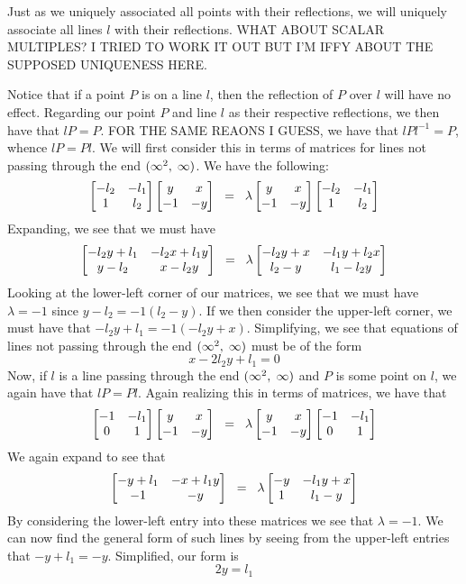\documentclass[12pt]{article}
\newcommand{\inv}{^{-1}}
\newcommand{\spceq}{\hspace{2mm} = \hspace{2mm}}
\newcommand{\ttc}{, \hspace{1mm}}
\newcommand{\lftmat}[4]{\begin{bmatrix} {#1} & {#2} \\ {#3} & {#4} \end{bmatrix}}
\newcommand{\pointmat}[2]{\lftmat{{#2}}{{#1}}{-1}{-{#2}}}
\newcommand{\stanpointmat}{\pointmat{x}{y}}
\newcommand{\linenoendmat}[2]{\begin{bmatrix} -{#2} & -{#1} \\ 1 & {#2} \end{bmatrix}}
\newcommand{\stanlinenoendmat}{\linenoendmat{l_1}{l_2}}
\newcommand{\lineendmat}[2]{\begin{bmatrix} -1 & -{#1} \\ 0 & 1 \end{bmatrix}}
\newcommand{\stanlineendmat}{\lineendmat{l_1}{l_2}}
\newcommand{\specialend}{(\infty^2\ttc\infty)}
\begin{document}
Just as we uniquely associated all points with their reflections, we will uniquely associate all lines $l$ with their reflections. WHAT ABOUT SCALAR MULTIPLES? I TRIED TO WORK IT OUT BUT I'M IFFY ABOUT THE SUPPOSED UNIQUENESS HERE. 

Notice that if a point $P$ is on a line $l$, then the reflection of $P$ over $l$ will have no effect. Regarding our point $P$ and line $l$ as their respective reflections, we then have that $lP = P$. FOR THE SAME REAONS I GUESS, we have that $lPl\inv = P$, whence $lP = Pl$. We will first consider this in terms of matrices for lines not passing through the end $\specialend$. We have the following:
\begin{equation} 
\stanlinenoendmat\stanpointmat \spceq \lambda \stanpointmat\stanlinenoendmat
\end{equation}	
Expanding, we see that we must have
\[
\lftmat{-l_2y+l_1}{-l_2x+l_1y}{y-l_2}{x-l_2y} \spceq \lambda \lftmat{-l_2y+x}{-l_1y+l_2x}{l_2-y}{l_1-l_2y}
\]
Looking at the lower-left corner of our matrices, we see that we must have $\lambda = -1$ since $y - l_2 = -1(l_2 - y)$. If we then consider the upper-left corner, we must have that $-l_2y + l_1 = -1(-l_2y + x)$. Simplifying, we see that equations of lines not passing through the end $\specialend$ must be of the form
\begin{equation}
x - 2l_2y + l_1  = 0
\end{equation} 
Now, if $l$ is a line passing through the end $\specialend$ and $P$ is some point on $l$, we again have that $lP = Pl$. Again realizing this in terms of matrices, we have that 
\begin{equation} 
\stanlineendmat\stanpointmat \spceq \lambda \stanpointmat\stanlineendmat
\end{equation}	
We again expand to see that 
\[
\lftmat{-y+l_1}{-x+l_1y}{-1}{-y} \spceq \lambda \lftmat{-y}{-l_1y+x}{1}{l_1-y}
\]
By considering the lower-left entry into these matrices we see that $\lambda = -1$. We can now find the general form of such lines by seeing from the upper-left entries that $-y+l_1 = -y$. Simplified, our form is 
\begin{equation}
2y=l_1
\end{equation} 
\end{document}
